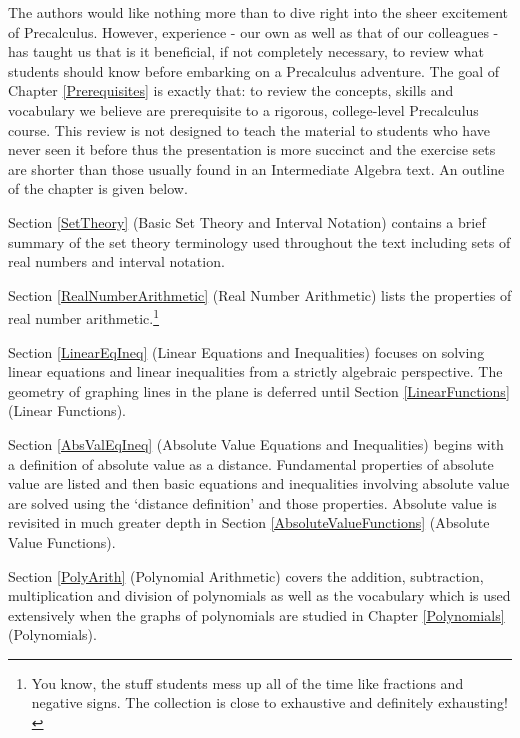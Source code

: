 The authors would like nothing more than to dive right into the sheer excitement of Precalculus. However, experience - our own as well as that of our colleagues - has taught us that is it beneficial, if not completely necessary, to review what students should know before embarking on a Precalculus adventure.  The goal of Chapter \ref{Prerequisites} is exactly that: to review the concepts, skills and vocabulary we believe are prerequisite to a rigorous, college-level Precalculus course.  This review is not designed to teach the material to students who have never seen it before thus the presentation is more succinct and the exercise sets are shorter than those usually found in an Intermediate Algebra text.  An outline of the chapter is given below.

\smallskip

Section \ref{SetTheory} (Basic Set Theory and Interval Notation) contains a brief summary of the set theory terminology used throughout the text including sets of real numbers and interval notation.

\smallskip

Section \ref{RealNumberArithmetic} (Real Number Arithmetic) lists the properties of real number arithmetic.\footnote{You know, the stuff students mess up all of the time like fractions and negative signs.  The collection is close to exhaustive and definitely exhausting!}

\smallskip

Section \ref{LinearEqIneq} (Linear Equations and Inequalities) focuses on solving linear equations and linear inequalities from a strictly algebraic perspective.  The geometry of graphing lines in the plane is deferred until Section \ref{LinearFunctions} (Linear Functions).

\smallskip

Section \ref{AbsValEqIneq} (Absolute Value Equations and Inequalities) begins with a definition of absolute value as a distance.  Fundamental properties of absolute value are listed and then basic equations and inequalities involving absolute value are solved using the `distance definition' and those properties.  Absolute value is revisited in much greater depth in Section \ref{AbsoluteValueFunctions} (Absolute Value Functions).

\smallskip

Section \ref{PolyArith} (Polynomial Arithmetic) covers the addition, subtraction, multiplication and division of polynomials as well as the vocabulary which is used extensively when the graphs of polynomials are studied in Chapter \ref{Polynomials} (Polynomials).

